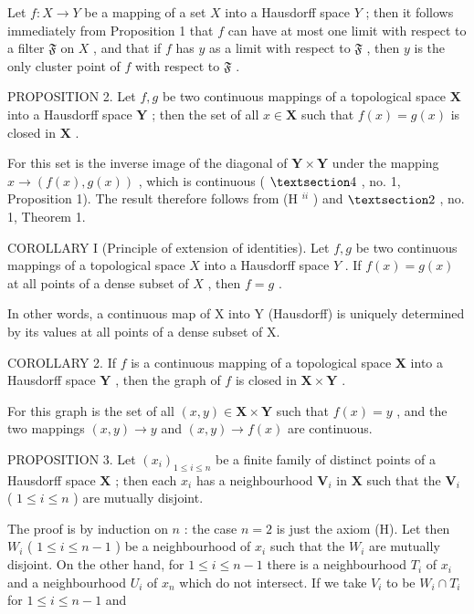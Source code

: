 Let \(f: X \to Y\) be a mapping of a set \(X\) into a Hausdorff space \(Y\) ; then it follows immediately from Proposition 1 that \(f\) can have at most one limit with respect to a filter \(\mathfrak{F}\) on \(X\) , and that if \(f\) has \(y\) as a limit with respect to \(\mathfrak{F}\) , then \(y\) is the only cluster point of \(f\) with respect to \(\mathfrak{F}\) .

PROPOSITION 2. Let \(f, g\) be two continuous mappings of a topological space \(\mathbf{X}\) into a Hausdorff space \(\mathbf{Y}\) ; then the set of all \(x \in \mathbf{X}\) such that \(f(x) = g(x)\) is closed in \(\mathbf{X}\) .

For this set is the inverse image of the diagonal of \(\mathbf{Y} \times \mathbf{Y}\) under the mapping \(x \to (f(x), g(x))\) , which is continuous ( \(\S 4\) , no. 1, Proposition 1). The result therefore follows from (H \(^{ii}\) ) and \(\S 2\) , no. 1, Theorem 1.

COROLLARY I (Principle of extension of identities). Let \(f, g\) be two continuous mappings of a topological space \(X\) into a Hausdorff space \(Y\) . If \(f(x) = g(x)\) at all points of a dense subset of \(X\) , then \(f = g\) .

In other words, a continuous map of X into Y (Hausdorff) is uniquely determined by its values at all points of a dense subset of X.

COROLLARY 2. If \(f\) is a continuous mapping of a topological space \(\mathbf{X}\) into a Hausdorff space \(\mathbf{Y}\) , then the graph of \(f\) is closed in \(\mathbf{X} \times \mathbf{Y}\) .

For this graph is the set of all \((x, y) \in \mathbf{X} \times \mathbf{Y}\) such that \(f(x) = y\) , and the two mappings \((x, y) \to y\) and \((x, y) \to f(x)\) are continuous.

PROPOSITION 3. Let \((x_{i})_{1\leqslant i\leqslant n}\) be a finite family of distinct points of a Hausdorff space \(\mathbf{X}\) ; then each \(x_{i}\) has a neighbourhood \(\mathbf{V}_{i}\) in \(\mathbf{X}\) such that the \(\mathbf{V}_{i}\) ( \(1\leqslant i\leqslant n\) ) are mutually disjoint.

The proof is by induction on \(n\) : the case \(n = 2\) is just the axiom (H). Let then \(W_i\) ( \(1 \leqslant i \leqslant n - 1\) ) be a neighbourhood of \(x_i\) such that the \(W_i\) are mutually disjoint. On the other hand, for \(1 \leqslant i \leqslant n - 1\) there is a neighbourhood \(T_i\) of \(x_i\) and a neighbourhood \(U_i\) of \(x_n\) which do not intersect. If we take \(V_i\) to be \(W_i \cap T_i\) for \(1 \leqslant i \leqslant n - 1\) and

